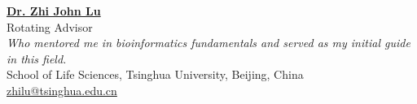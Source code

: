 \vspace{4pt}


\textbf{\href{https://life.tsinghua.edu.cn/lifeen/info/1034/1083.htm}{Dr. Zhi John Lu}}\\
Rotating Advisor\\
\textit{Who mentored me in bioinformatics fundamentals and served as my initial guide in this field.}\\
School of Life Sciences, Tsinghua University, Beijing, China\\
\href{mailto:zhilu@tsinghua.edu.cn}{zhilu@tsinghua.edu.cn}\\

\vspace{4pt}









